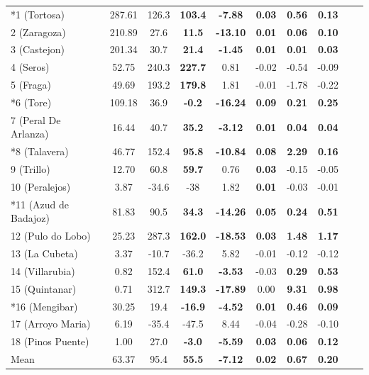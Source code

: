 \begin{table}[hbtp]
{\begin{tabular}{lccccccccc}
        \midrule
        *1 (Tortosa)        & 287.61  & 126.3 & \textbf{103.4} & \textbf{-7.88} & \textbf{0.03}  & \textbf{0.56}  & \textbf{0.13}  \\
        2 (Zaragoza)        & 210.89  & 27.6 & \textbf{11.5}   & \textbf{-13.10}  & \textbf{0.01}  & \textbf{0.06}  & \textbf{0.10}  \\
        3 (Castejon)        & 201.34  & 30.7 & \textbf{21.4}   & \textbf{-1.45}  & \textbf{0.01}  & \textbf{0.01}  & \textbf{0.03}  \\
        4 (Seros)           & 52.75   & 240.3 & \textbf{227.7} & 0.81   & -0.02 & -0.54 & -0.09 \\
        5 (Fraga)           & 49.69   & 193.2 & \textbf{179.8} & 1.81   & -0.01 & -1.78 & -0.22 \\
        *6 (Tore)           & 109.18  & 36.9 & \textbf{-0.2}   & \textbf{-16.24} & \textbf{0.09}  & \textbf{0.21}  & \textbf{0.25}  \\
        7 (Peral De Arlanza) & 16.44  & 40.7 & \textbf{35.2}   & \textbf{-3.12}  & \textbf{0.01}  & \textbf{0.04}  & \textbf{0.04}  \\
        *8 (Talavera)       & 46.77   & 152.4 & \textbf{95.8}  & \textbf{-10.84} & \textbf{0.08}  & \textbf{2.29}  & \textbf{0.16}  \\
        9 (Trillo)          & 12.70   & 60.8 & \textbf{59.7}   & 0.76   & \textbf{0.03}  & -0.15 & -0.05 \\
        10 (Peralejos)      & 3.87    & -34.6 & -38            & 1.82   & \textbf{0.01}  & -0.03 & -0.01 \\
        *11 (Azud de Badajoz) & 81.83 & 90.5 & \textbf{34.3}   & \textbf{-14.26} & \textbf{0.05}  & \textbf{0.24}  & \textbf{0.51}  \\
        12 (Pulo do Lobo)   & 25.23   & 287.3 & \textbf{162.0} & \textbf{-18.53} & \textbf{0.03}  & \textbf{1.48}  & \textbf{1.17}  \\
        13 (La Cubeta)      & 3.37    & -10.7 & -36.2          & 5.82   & -0.01 & -0.12 & -0.12 \\
        14 (Villarubia)     & 0.82    & 152.4 & \textbf{61.0}  & \textbf{-3.53} & -0.03 & \textbf{0.29}  & \textbf{0.53}  \\
        15 (Quintanar)      & 0.71    & 312.7 & \textbf{149.3} & \textbf{-17.89} & 0.00  & \textbf{9.31}  & \textbf{0.98}  \\
        *16 (Mengibar)      & 30.25   & 19.4 & \textbf{-16.9}  & \textbf{-4.52} & \textbf{0.01}  & \textbf{0.46}  & \textbf{0.09}  \\
        17 (Arroyo Maria)   & 6.19    & -35.4 & -47.5 & 8.44   & -0.04 & -0.28 & -0.10 \\
        18 (Pinos Puente)   & 1.00    & 27.0 & \textbf{-3.0}   & \textbf{-5.59}  & \textbf{0.03}  & \textbf{0.06}  & \textbf{0.12}  \\
        \midrule
        Mean                & 63.37   & 95.4 & \textbf{55.5}   & \textbf{-7.12} & \textbf{0.02}  & \textbf{0.67}  & \textbf{0.20}  \\
        \bottomrule
    \end{tabular}
    }
    \label{table:stations_metrics}
\end{table}

